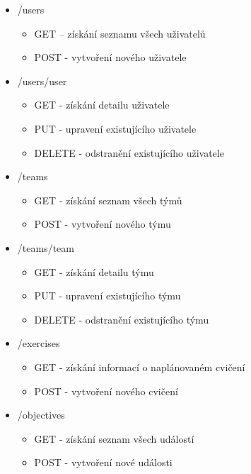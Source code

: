 \documentclass[
  digital, %
  twoside, %
  table,   %
  lof,     %
  lot,     %
]{fithesis3}
\begin{document}
\renewcommand\labelitemii{$\square$}
\begin{itemize}
    \item /users
    \begin{itemize}
        \item GET -- získání seznamu všech uživatelů
        \item POST -  vytvoření nového uživatele
    \end{itemize}
    
    \item /users/{user}
    \begin{itemize}
        \item GET - získání detailu uživatele
        \item PUT - upravení existujícího uživatele
        \item DELETE - odstranění existujícího uživatele
    \end{itemize}
    
    \item /teams
    \begin{itemize}
        \item GET - získání seznam všech týmů
        \item POST -  vytvoření nového týmu
    \end{itemize}
    
    \item /teams/{team}
    \begin{itemize}
        \item GET - získání detailu týmu
        \item PUT - upravení existujícího týmu
        \item DELETE - odstranění existujícího týmu
    \end{itemize}
    
    \item /exercises
    \begin{itemize}
        \item GET - získání informací o naplánovaném cvičení
        \item POST - vytvoření nového cvičení
    \end{itemize}
    
    \item /objectives
    \begin{itemize}
        \item GET - získání seznam všech událostí
        \item POST -  vytvoření nové události
    \end{itemize}
        

\end{itemize}
\end{document}
